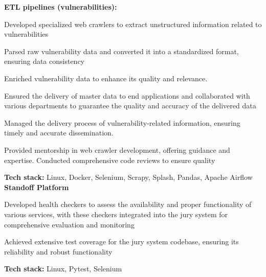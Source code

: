 \documentclass[a4paper]{MagicalCV}
\begin{document}
\begin{minipage}[t]{0.64\textwidth}
\textbf{ETL pipelines (vulnerabilities):}
\begin{tightemize}
  \item Developed specialized web crawlers to extract unstructured information related to vulnerabilities
  \item Parsed raw vulnerability data and converted it into a standardized format, ensuring data consistency
  \item Enriched vulnerability data to enhance its quality and relevance.
  \item Ensured the delivery of master data to end applications and collaborated with various departments to guarantee the quality and accuracy of the delivered data
  \item Managed the delivery process of vulnerability-related information, ensuring timely and accurate dissemination.
  \item Provided mentorship in web crawler development, offering guidance and expertise. Conducted comprehensive code reviews to ensure quality
\end{tightemize}
\textbf{Tech stack:} Linux, Docker, Selenium, Scrapy, Splash, Pandas, Apache Airflow \\
\vspace{\topsep}
\textbf{Standoff Platform}
\begin{tightemize}
  \item Developed health checkers to assess the availability and proper functionality of various services, with these checkers integrated into the jury system for comprehensive evaluation and monitoring
  \item Achieved extensive test coverage for the jury system codebase, ensuring its reliability and robust functionality
\end{tightemize}
\textbf{Tech stack:} Linux, Pytest, Selenium
\sectionsep


\end{minipage} 
\end{document}
